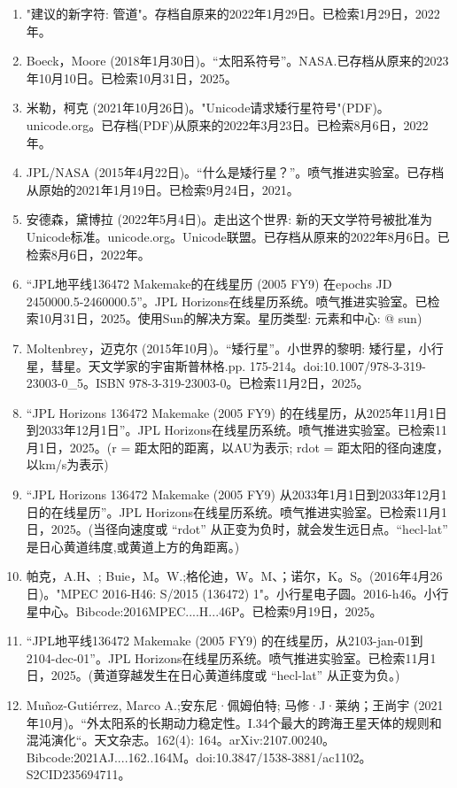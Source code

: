 \begin{enumerate}
\item "建议的新字符: 管道"。存档自原来的2022年1月29日。已检索1月29日，2022年。
\item Boeck，Moore (2018年1月30日)。“太阳系符号”。NASA.已存档从原来的2023年10月10日。已检索10月31日，2025。
\item 米勒，柯克 (2021年10月26日)。"Unicode请求矮行星符号"(PDF)。unicode.org。已存档(PDF)从原来的2022年3月23日。已检索8月6日，2022年。
\item JPL/NASA (2015年4月22日)。“什么是矮行星？”。喷气推进实验室。已存档从原始的2021年1月19日。已检索9月24日，2021。
\item 安德森，黛博拉 (2022年5月4日)。走出这个世界: 新的天文学符号被批准为Unicode标准。unicode.org。Unicode联盟。已存档从原来的2022年8月6日。已检索8月6日，2022年。
\item “JPL地平线136472 Makemake的在线星历 (2005 FY9) 在epochs JD 2450000.5-2460000.5”。JPL Horizons在线星历系统。喷气推进实验室。已检索10月31日，2025。使用Sun的解决方案。星历类型: 元素和中心: @ sun)
\item Moltenbrey，迈克尔 (2015年10月)。“矮行星”。小世界的黎明: 矮行星，小行星，彗星。天文学家的宇宙斯普林格.pp. 175-214。doi:10.1007/978-3-319-23003-0_5。ISBN 978-3-319-23003-0。已检索11月2日，2025。
\item “JPL Horizons 136472 Makemake (2005 FY9) 的在线星历，从2025年11月1日到2033年12月1日”。JPL Horizons在线星历系统。喷气推进实验室。已检索11月1日，2025。(r = 距太阳的距离，以AU为表示; rdot = 距太阳的径向速度，以km/s为表示)
\item “JPL Horizons 136472 Makemake (2005 FY9) 从2033年1月1日到2033年12月1日的在线星历”。JPL Horizons在线星历系统。喷气推进实验室。已检索11月1日，2025。(当径向速度或 “rdot” 从正变为负时，就会发生远日点。“hecl-lat” 是日心黄道纬度,或黄道上方的角距离。)
\item 帕克，A.H、; Buie，M。W.;格伦迪，W。M、；诺尔，K。S。(2016年4月26日)。"MPEC 2016-H46: S/2015 (136472) 1"。小行星电子圆。2016-h46。小行星中心。Bibcode:2016MPEC....H...46P。已检索9月19日，2025。
\item “JPL地平线136472 Makemake (2005 FY9) 的在线星历，从2103-jan-01到2104-dec-01”。JPL Horizons在线星历系统。喷气推进实验室。已检索11月1日，2025。(黄道穿越发生在日心黄道纬度或 “hecl-lat” 从正变为负。)
\item Muñoz-Gutiérrez, Marco A.;安东尼·佩姆伯特; 马修·J·莱纳；王尚宇 (2021年10月)。“外太阳系的长期动力稳定性。I.34个最大的跨海王星天体的规则和混沌演化“。天文杂志。162(4): 164。arXiv:2107.00240。Bibcode:2021AJ....162..164M。doi:10.3847/1538-3881/ac1102。S2CID235694711。 

\end{enumerate}
